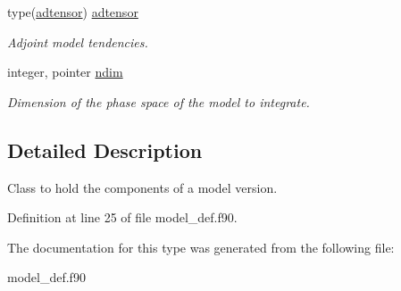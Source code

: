 \begin{DoxyCompactItemize}
type(\hyperlink{structtl__ad__tensor_1_1adtensor}{adtensor}) \hyperlink{structmodel__def_1_1model_a5fd98607a716156493328f547110c4fb}{adtensor}
\begin{DoxyCompactList}\small\item\em Adjoint model tendencies. \end{DoxyCompactList}\item 
\mbox{\label{structmodel__def_1_1model_a7d00fa265bddc896253a230a906f02e5}} 
integer, pointer \hyperlink{structmodel__def_1_1model_a7d00fa265bddc896253a230a906f02e5}{ndim}
\begin{DoxyCompactList}\small\item\em Dimension of the phase space of the model to integrate. \end{DoxyCompactList}\end{DoxyCompactItemize}


\subsection{Detailed Description}
Class to hold the components of a model version. 

Definition at line 25 of file model\+\_\+def.\+f90.



The documentation for this type was generated from the following file\+:\begin{DoxyCompactItemize}
\item 
model\+\_\+def.\+f90\end{DoxyCompactItemize}

